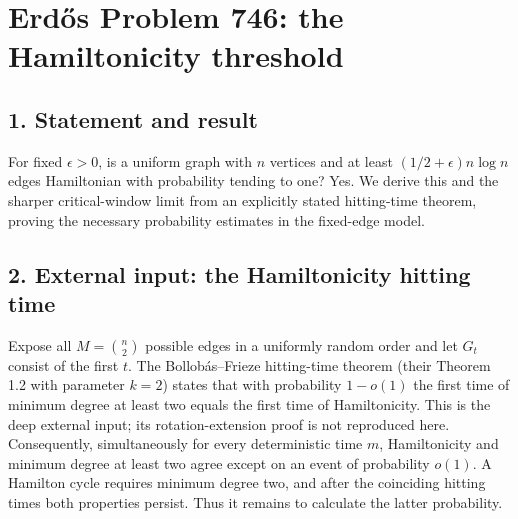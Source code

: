 \section*{Erd\H{o}s Problem 746: the Hamiltonicity threshold}
\subsection*{1. Statement and result}
For fixed $\epsilon>0$, is a uniform graph with $n$ vertices and at least $(1/2+\epsilon)n\log n$ edges Hamiltonian with probability tending to one? Yes. We derive this and the sharper critical-window limit from an explicitly stated hitting-time theorem, proving the necessary probability estimates in the fixed-edge model.
\subsection*{2. External input: the Hamiltonicity hitting time}
Expose all $M=\binom n2$ possible edges in a uniformly random order and let $G_t$ consist of the first $t$. The Bollob\'as--Frieze hitting-time theorem (their Theorem 1.2 with parameter $k=2$) states that with probability $1-o(1)$ the first time of minimum degree at least two equals the first time of Hamiltonicity. This is the deep external input; its rotation-extension proof is not reproduced here.
Consequently, simultaneously for every deterministic time $m$, Hamiltonicity and minimum degree at least two agree except on an event of probability $o(1)$. A Hamilton cycle requires minimum degree two, and after the coinciding hitting times both properties persist. Thus it remains to calculate the latter probability.
